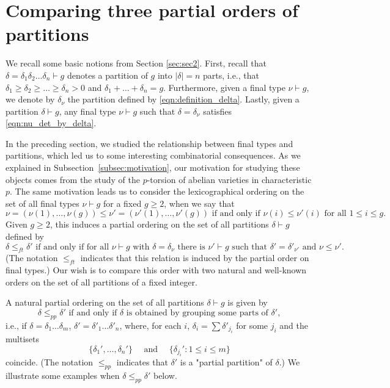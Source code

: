 \documentclass[11pt]{amsart}
\numberwithin{equation}{section}
\theoremstyle{plain}
\newcommand{\<}{\left \langle}
\renewcommand{\>}{\right \rangle}
\theoremstyle{definition}
\theoremstyle{remark}
\begin{document}
\section{Comparing three partial orders of partitions}
\label{sec:order}

We recall some basic notions from Section \ref{sec:sec2}.
First, recall that $\delta = \delta_1\delta_2\ldots\delta_n \vdash g$ denotes a partition of $g$ into $|\delta| = n$ parts, i.e., that $\delta_1 \geq \delta_2 \geq \ldots \geq \delta_n > 0$ and $\delta_1 + \ldots + \delta_n = g$. Furthermore, given a final type $\nu \vdash g$, we denote by $\delta_{\nu}$ the partition defined by \eqref{eqn:definition_delta}. Lastly, given a partition $\delta \vdash g$, any final type $\nu \vdash g$ such that $\delta = \delta_{\nu}$ satisfies \eqref{eqn:nu_det_by_delta}.

In the preceding section, we studied the relationship between final types and partitions, which led us to some interesting combinatorial consequences. 
As we explained in Subsection~\ref{subsec:motivation}, our motivation for studying these objects comes from the study of the $p$-torsion of abelian varieties in characteristic $p$. 
The same motivation leads us to consider the lexicographical ordering on the set of all final types $\nu \vdash g$ for a fixed $g \geq 2$, when we say that $$\nu = (\nu(1), \ldots, \nu(g)) \leq \nu' = (\nu'(1), \ldots, \nu'(g)) \text{ if and only if } \nu(i) \leq \nu'(i) \text{ for all }1 \leq i \leq g.$$
Given $g \geq 2$, this induces a partial ordering on the set of all partitions $\delta \vdash g$ defined by $$\delta \leq_{ft} \delta' \text{ if and only if for all } \nu\vdash g \text{ with } \delta = \delta_{\nu} \text{ there is } \nu' \vdash g \text{ such that } \delta' = \delta'_{\nu'} \text{ and } \nu \leq \nu'.$$
(The notation $\leq_{ft}$ indicates that this relation is induced by the partial order on final types.) Our wish is to compare this order with two natural and well-known orders on the set of all partitions of a fixed integer. 

A natural partial ordering on the set of all partitions $\delta \vdash g$ is given by $$\delta \leq_{pp} \delta' \text{ if and only if } \delta \text{ is obtained by grouping some parts of } \delta', $$
i.e., if $\delta = \delta_1\ldots\delta_m$, $\delta' = \delta'_1\ldots\delta'_n$, where, for each $i$, $\delta_i = \sum \delta'_{j_i}$ for some $j_i$ and the multisets $$\{\delta_1', \ldots, \delta_n'\}\quad \text{ and } \quad \{\delta_{j_i}': 1 \leq i \leq m\}$$ coincide. (The notation $\leq_{pp}$ indicates that $\delta'$ is a "partial partition" of $\delta$.) We illustrate some examples when $\delta \leq_{pp} \delta'$ below. 
\end{document}
